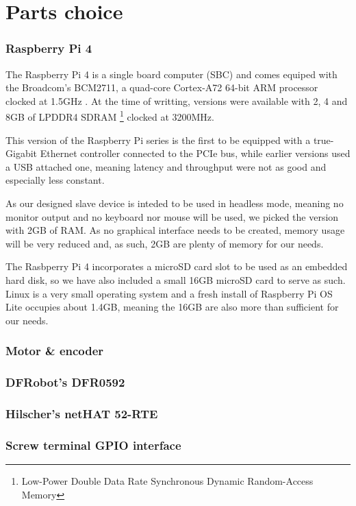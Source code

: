 \section{Parts choice} \label{sec:parts_choice}



\subsubsection{Raspberry Pi 4}
The Raspberry Pi 4 is a single board computer (SBC) and comes equiped with the Broadcom's BCM2711, a quad-core Cortex-A72 64-bit ARM processor clocked at 1.5GHz \cite{technology:rpi4-specs}.
At the time of writting, versions were available with 2, 4 and 8GB of LPDDR4 SDRAM \footnote{Low-Power Double Data Rate Synchronous Dynamic Random-Access Memory} clocked at 3200MHz.

This version of the Raspberry Pi series is the first to be equipped with a true-Gigabit Ethernet controller connected to the PCIe bus, while earlier versions used a USB attached one, meaning latency and throughput were not as good and especially less constant.

As our designed slave device is inteded to be used in headless mode, meaning no monitor output and no keyboard nor mouse will be used, we picked the version with 2GB of RAM.
As no graphical interface needs to be created, memory usage will be very reduced and, as such, 2GB are plenty of memory for our needs.

The Rasbperry Pi 4 incorporates a microSD card slot to be used as an embedded hard disk, so we have also included a small 16GB microSD card to serve as such.
Linux is a very small operating system and a fresh install of Raspberry Pi OS Lite occupies about 1.4GB, meaning the 16GB are also more than sufficient for our needs.

\subsubsection{Motor \& encoder}


\subsubsection{DFRobot's DFR0592}


\subsubsection{Hilscher's netHAT 52-RTE}


\subsubsection{Screw terminal GPIO interface}

